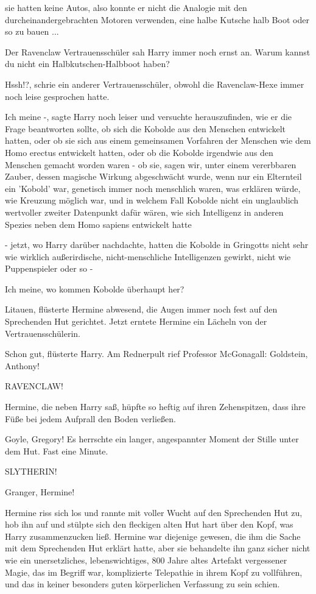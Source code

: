 sie hatten keine Autos, also konnte er nicht die Analogie mit den
durcheinandergebrachten Motoren verwenden, \glqq{}eine halbe Kutsche halb Boot
oder so zu bauen ...\grqq{}

Der Ravenclaw Vertrauensschüler sah Harry immer noch ernst an. \glqq{}Warum
kannst du nicht ein Halbkutschen-Halbboot haben?\grqq{}

\glqq{}Hssh!?\grqq{}, schrie ein anderer Vertrauensschüler, obwohl die
Ravenclaw-Hexe immer noch leise gesprochen hatte.

\glqq{}Ich meine -\grqq{}, sagte Harry noch leiser und versuchte herauszufinden,
wie er die Frage beantworten sollte, ob sich die Kobolde aus den Menschen
entwickelt hatten, oder ob sie sich aus einem gemeinsamen Vorfahren der Menschen
wie dem Homo erectus entwickelt hatten, oder ob die Kobolde irgendwie aus den
Menschen gemacht worden waren - ob sie, sagen wir, unter einem vererbbaren
Zauber, dessen magische Wirkung abgeschwächt wurde, wenn nur ein Elternteil ein
'Kobold' war, genetisch immer noch menschlich waren, was erklären würde, wie
Kreuzung möglich war, und in welchem Fall Kobolde nicht ein unglaublich
wertvoller zweiter Datenpunkt dafür wären, wie sich Intelligenz in anderen
Spezies neben dem Homo sapiens entwickelt hatte

- jetzt, wo Harry darüber nachdachte, hatten die Kobolde in Gringotts nicht sehr
wie wirklich außerirdische, nicht-menschliche Intelligenzen gewirkt, nicht wie
Puppenspieler oder so -

\glqq{}Ich meine, wo kommen Kobolde überhaupt her?\grqq{}

\glqq{}Litauen\grqq{}, flüsterte Hermine abwesend, die Augen immer noch fest auf
den Sprechenden Hut gerichtet. Jetzt erntete Hermine ein Lächeln von der
Vertrauensschülerin.

\glqq{}Schon gut\grqq{}, flüsterte Harry. Am Rednerpult rief Professor
McGonagall: \glqq{}Goldstein, Anthony!\grqq{}

\glqq{}RAVENCLAW!\grqq{}

Hermine, die neben Harry saß, hüpfte so heftig auf ihren Zehenspitzen, dass ihre
Füße bei jedem Aufprall den Boden verließen.

\glqq{}Goyle, Gregory!\grqq{} Es herrschte ein langer, angespannter Moment der
Stille unter dem Hut. Fast eine Minute.

\glqq{}SLYTHERIN!\grqq{}

\glqq{}Granger, Hermine!\grqq{}

Hermine riss sich los und rannte mit voller Wucht auf den Sprechenden Hut zu,
hob ihn auf und stülpte sich den fleckigen alten Hut hart über den Kopf, was
Harry zusammenzucken ließ. Hermine war diejenige gewesen, die ihm die Sache mit
dem Sprechenden Hut erklärt hatte, aber sie behandelte ihn ganz sicher nicht wie
ein unersetzliches, lebenswichtiges, 800 Jahre altes Artefakt vergessener Magie,
das im Begriff war, komplizierte Telepathie in ihrem Kopf zu vollführen, und das
in keiner besonders guten körperlichen Verfassung zu sein schien.

